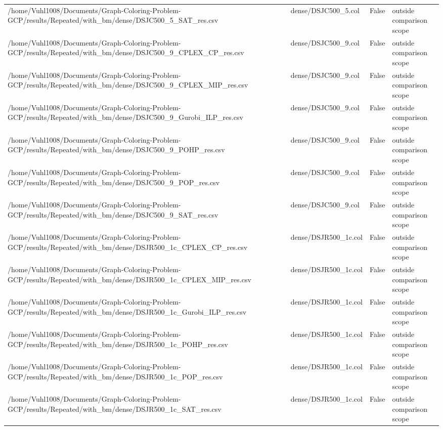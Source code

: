 \begin{table}[htbp]
\begin{tabular}{llll}
/home/Vuhl1008/Documents/Graph-Coloring-Problem-GCP/results/Repeated/with\_bm/dense/DSJC500\_5\_SAT\_res.csv & dense/DSJC500\_5.col & False & outside comparison scope \\
/home/Vuhl1008/Documents/Graph-Coloring-Problem-GCP/results/Repeated/with\_bm/dense/DSJC500\_9\_CPLEX\_CP\_res.csv & dense/DSJC500\_9.col & False & outside comparison scope \\
/home/Vuhl1008/Documents/Graph-Coloring-Problem-GCP/results/Repeated/with\_bm/dense/DSJC500\_9\_CPLEX\_MIP\_res.csv & dense/DSJC500\_9.col & False & outside comparison scope \\
/home/Vuhl1008/Documents/Graph-Coloring-Problem-GCP/results/Repeated/with\_bm/dense/DSJC500\_9\_Gurobi\_ILP\_res.csv & dense/DSJC500\_9.col & False & outside comparison scope \\
/home/Vuhl1008/Documents/Graph-Coloring-Problem-GCP/results/Repeated/with\_bm/dense/DSJC500\_9\_POHP\_res.csv & dense/DSJC500\_9.col & False & outside comparison scope \\
/home/Vuhl1008/Documents/Graph-Coloring-Problem-GCP/results/Repeated/with\_bm/dense/DSJC500\_9\_POP\_res.csv & dense/DSJC500\_9.col & False & outside comparison scope \\
/home/Vuhl1008/Documents/Graph-Coloring-Problem-GCP/results/Repeated/with\_bm/dense/DSJC500\_9\_SAT\_res.csv & dense/DSJC500\_9.col & False & outside comparison scope \\
/home/Vuhl1008/Documents/Graph-Coloring-Problem-GCP/results/Repeated/with\_bm/dense/DSJR500\_1c\_CPLEX\_CP\_res.csv & dense/DSJR500\_1c.col & False & outside comparison scope \\
/home/Vuhl1008/Documents/Graph-Coloring-Problem-GCP/results/Repeated/with\_bm/dense/DSJR500\_1c\_CPLEX\_MIP\_res.csv & dense/DSJR500\_1c.col & False & outside comparison scope \\
/home/Vuhl1008/Documents/Graph-Coloring-Problem-GCP/results/Repeated/with\_bm/dense/DSJR500\_1c\_Gurobi\_ILP\_res.csv & dense/DSJR500\_1c.col & False & outside comparison scope \\
/home/Vuhl1008/Documents/Graph-Coloring-Problem-GCP/results/Repeated/with\_bm/dense/DSJR500\_1c\_POHP\_res.csv & dense/DSJR500\_1c.col & False & outside comparison scope \\
/home/Vuhl1008/Documents/Graph-Coloring-Problem-GCP/results/Repeated/with\_bm/dense/DSJR500\_1c\_POP\_res.csv & dense/DSJR500\_1c.col & False & outside comparison scope \\
/home/Vuhl1008/Documents/Graph-Coloring-Problem-GCP/results/Repeated/with\_bm/dense/DSJR500\_1c\_SAT\_res.csv & dense/DSJR500\_1c.col & False & outside comparison scope \\

\end{tabular}
\end{table}

